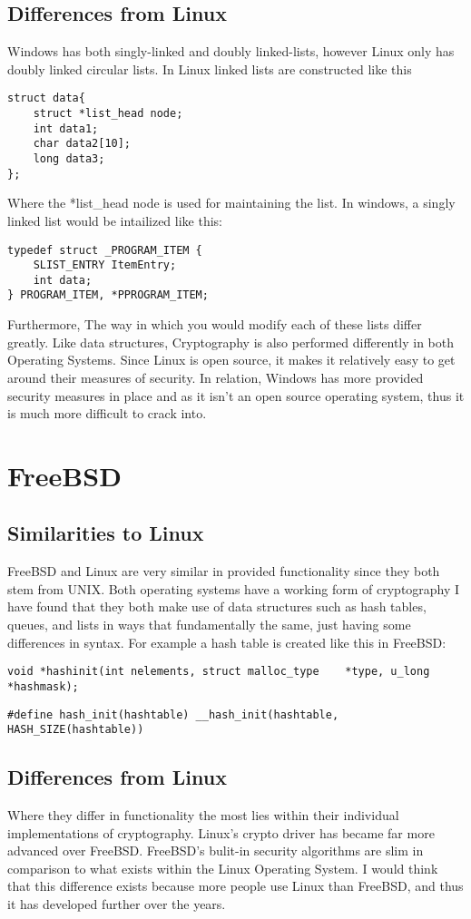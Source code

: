 \documentclass[letterpaper,10pt,draftclsnofoot,onecolumn, titlepage]{IEEEtran}
\begin{document}
\subsection{Differences from Linux}
Windows has both singly-linked and doubly linked-lists, however Linux only has doubly linked circular lists. In Linux linked lists are constructed like this
\begin{lstlisting}
struct data{
	struct *list_head node;
	int data1;
	char data2[10];
	long data3;
};
\end{lstlisting}
Where the *list_head node is used for maintaining the list. In windows, a singly linked list would be intailized like this:
\begin{lstlisting}
typedef struct _PROGRAM_ITEM {
    SLIST_ENTRY ItemEntry;
    int data; 
} PROGRAM_ITEM, *PPROGRAM_ITEM;
\end{lstlisting}
Furthermore, The way in which you would modify each of these lists differ greatly. Like data structures, Cryptography is also performed differently in both Operating Systems. Since Linux is open source, it makes it relatively easy to get around their measures of security. In relation, Windows has more provided security measures in place and as it isn't an open source operating system, thus it is much more difficult to crack into\cite{windows}.
\section{FreeBSD}
\subsection{Similarities to Linux}
FreeBSD and Linux are very similar in provided functionality since they both stem from UNIX. Both operating systems have a working form of cryptography I have found that they both make use of data structures such as hash tables, queues, and lists in ways that fundamentally the same, just having some differences in syntax. For example a hash table is created like this in FreeBSD:
\begin{lstlisting}
void *hashinit(int nelements, struct malloc_type	*type, u_long *hashmask);
\end{lstlisting}
\begin{lstlisting}
#define hash_init(hashtable) __hash_init(hashtable, HASH_SIZE(hashtable))
\end{lstlisting}
\subsection{Differences from Linux}
Where they differ in functionality the most lies within their individual implementations of cryptography. Linux's crypto driver has became far more advanced over FreeBSD. FreeBSD's bulit-in security algorithms are slim in comparison to what exists within the Linux Operating System. I would think that this difference exists because more people use Linux than FreeBSD, and thus it has developed further over the years.

\begin{lstlisting}
\end{lstlisting}

\newpage


\end{document}
